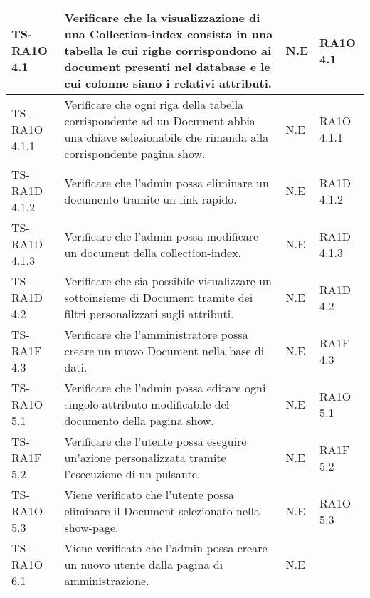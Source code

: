\begin{center}
\begin{longtable}{| p{3cm} | p{6cm} | p{1.5cm} | p{2cm} | }
        TS-RA1O 4.1 & 
        Verificare che la visualizzazione di una Collection-index consista in una tabella le cui righe corrispondono ai document presenti nel database e le cui colonne siano i relativi attributi. & N.E &       
            RA1O 4.1 \newline  \\ \hline 
        TS-RA1O 4.1.1 & 
        Verificare che ogni riga della tabella corrispondente ad un Document abbia una chiave selezionabile che rimanda alla corrispondente pagina show.
 & N.E &       
            RA1O 4.1.1 \newline  \\ \hline 
        TS-RA1D 4.1.2 & 
        Verificare che l'admin possa eliminare un documento tramite un link rapido. & N.E &       
            RA1D 4.1.2 \newline  \\ \hline 
        TS-RA1D 4.1.3 & 
        Verificare che l'admin possa modificare un document della collection-index.
 & N.E &       
            RA1D 4.1.3 \newline  \\ \hline 
        TS-RA1D 4.2 & 
        Verificare che sia possibile visualizzare un sottoinsieme di Document tramite dei filtri personalizzati sugli attributi. & N.E &       
            RA1D 4.2 \newline  \\ \hline 
        TS-RA1F 4.3 & 
        Verificare che l'amministratore possa creare un nuovo Document nella base di dati. & N.E &       
            RA1F 4.3 \newline  \\ \hline 
        TS-RA1O 5.1 & 
        Verificare che l'admin possa editare ogni singolo attributo modificabile del documento della pagina show. & N.E &       
            RA1O 5.1 \newline  \\ \hline 
        TS-RA1F 5.2 & 
        Verificare che l'utente possa eseguire un'azione personalizzata tramite l'esecuzione di un pulsante. & N.E &       
            RA1F 5.2 \newline  \\ \hline 
        TS-RA1O 5.3 & 
        Viene verificato che l'utente possa eliminare il Document selezionato nella show-page. & N.E &       
            RA1O 5.3 \newline  \\ \hline 
        TS-RA1O 6.1 & 
        Viene verificato che l'admin possa creare un nuovo utente dalla pagina di amministrazione. & N.E &       

\end{longtable}
\end{center}
